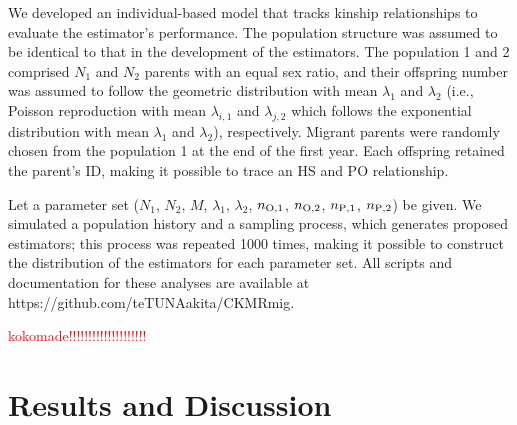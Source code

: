\documentclass[12pt, English]{article}
\def\RED#1{\textcolor{red}{#1}} %
\begin{document}
\begin{spacing}{1.9}
We developed an individual-based model that tracks kinship relationships to evaluate the estimator's performance. The population structure was assumed to be identical to that in the development of the estimators. The population 1 and 2 comprised $N_1$ and $N_2$ parents with an equal sex ratio, and their offspring number was assumed to follow the geometric distribution with mean $\lambda_1$ and $\lambda_2$ (i.e., Poisson reproduction with mean $\lambda_{i,1}$ and $\lambda_{j,2}$ which follows the exponential distribution with mean $\lambda_1$ and $\lambda_2$), respectively. Migrant parents were randomly chosen from the population 1 at the end of the first year. Each offspring retained the parent's ID, making it possible to trace an HS and PO relationship.

Let a parameter set ($N_1$, $N_2$, $M$, $\lambda_1$, $\lambda_2$, $n_{\rm O,1}$, $n_{\rm O,2}$, $n_{\rm P,1}$, $n_{\rm P,2}$) be given. We simulated a population history and a sampling process, which generates proposed estimators; this process was repeated 1000 times, making it possible to construct the distribution of the estimators for each parameter set. All scripts and documentation for these analyses are available at \\https://github.com/teTUNAakita/CKMRmig.

\RED{kokomade!!!!!!!!!!!!!!!!!!!!}

\section{Results and Discussion}\label{sec3}


\begin{center}
\end{center}


\begin{comment}

The estimation of the ratio of the contemporary effective population size to the census size ($N_{\rm e}/N$) has attracted much research attention for providing information about a current population, especially in the context of conservation biology and wildlife management \cite[]{Palstra_2012,FRANKHAM201456}. Small $N_{\rm e}/N$ demonstrates large variance in reproductive success \cite[]{Wang:2016aa, JFB:JFB13143, Akita_2019}, resulting from the variance of reproductive potential \cite[e.g., the big old fat fecund female fish hypothesis;][]{Hixon_2014} or from the situation in which only some families successfully reproduce \cite[referred to as the ``Sweepstakes reproductive success'' hypothesis,][]{hedgecock2011sweepstakes}. Moreover, if $N_{\rm e}/N$ is invariant across years, then $N_{\rm e}$ may behave like an index of $N$, and vice versa \cite[]{luikart2010estimation}. However, if $N_{\rm e}/N$ fluctuates across years, the trends can clarify the interpretation of environmental and/or anthropological factors, causing the variance of reproductive potential, family-correlated survivorship, or fluctuating population dynamics. Besides, low precision and/or large bias for estimating $N_{\rm e}/N$ may lead to a wrong interpretation of the population \cite[]{Tallmon:2012aa}.


\end{comment}
\end{spacing}
\end{document}
